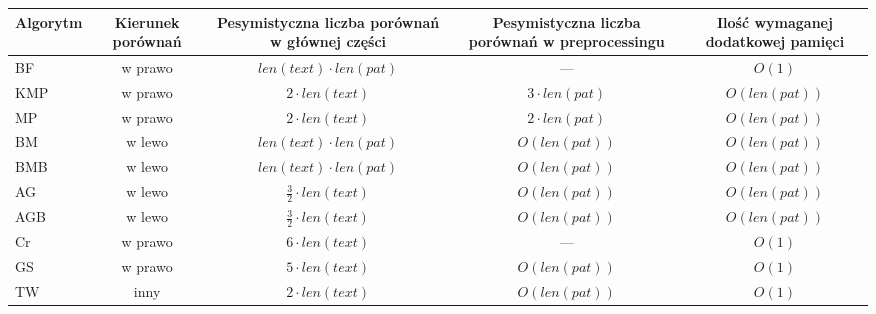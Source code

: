 \vspace{1cm}
{
\centering
\settowidth{}
\begin{tabulary}{1.0\linewidth}{@{}JCCCC@{}}
    \toprule
    Algorytm & Kierunek porównań & Pesymistyczna liczba porównań w głównej części & Pesymistyczna liczba porównań w preprocessingu & Ilość wymaganej dodatkowej pamięci \\
    \midrule
    BF & w prawo & $len(text) \cdot len(pat)$ & --- & $O(1)$ \\
    KMP & w prawo & $2 \cdot len(text)$ & $3 \cdot len(pat)$ & $O(len(pat))$ \\
    MP & w prawo & $2 \cdot len(text)$ & $2 \cdot len(pat)$ & $O(len(pat))$ \\
    BM & w lewo & $len(text) \cdot len(pat)$ & $O(len(pat))$ & $O(len(pat))$ \\
    BMB & w lewo & $len(text) \cdot len(pat)$ & $O(len(pat))$ & $O(len(pat))$ \\
    AG & w lewo & $\frac{3}{2} \cdot len(text)$ & $O(len(pat))$ & $O(len(pat))$ \\
    AGB & w lewo & $\frac{3}{2} \cdot len(text)$ & $O(len(pat))$ & $O(len(pat))$ \\
    Cr & w prawo & $6 \cdot len(text)$ & --- & $O(1)$\\
    GS & w prawo & $5 \cdot len(text)$ & $O(len(pat))$ & $O(1)$ \\
    TW & inny & $2 \cdot len(text)$ & $O(len(pat))$ & $O(1)$ \\
    \bottomrule
\end{tabulary}\par
}